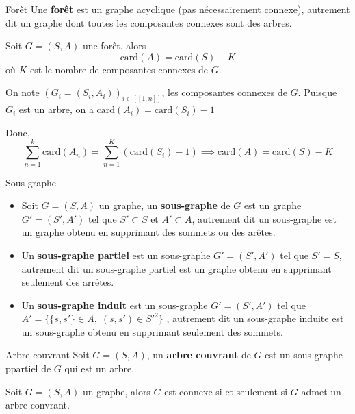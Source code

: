 \begin{Definition}[colbacktitle=red!75!black]{Forêt}{}
Une \textbf{forêt} est un graphe acyclique (pas nécessairement connexe), autrement dit un graphe dont toutes les composantes connexes sont des arbres.
\end{Definition}

\begin{Prop}{}{}
Soit $G = (S,A)$   une forêt, alors \[
\mathrm{card}(A) = \mathrm{card}  (S) - K
\]
où $K$   est le nombre de composantes connexes de $G$.
\end{Prop}

\begin{myproof}
  On note $\left( G_i = (S_i, A_i) \right) _{i \in [\![1,n]\!]}$, les composantes connexes de $G$. Puisque $G_i$ est un arbre, on a $\mathrm{card}(A_i) = \mathrm{card}(S_i) - 1$  

  Donc, \[
  \sum_{n=1}^{k} \mathrm{card} (A_n) = \sum_{n=1}^{K} (\mathrm{card} (S_i)-1) \implies \mathrm{card} (A) = \mathrm{card} (S) - K
  \]
\end{myproof}

\begin{Definition}[colbacktitle=red!75!black]{Sous-graphe}{}
  \begin{itemize}
    \item Soit $G=(S,A)$ un graphe, un \textbf{sous-graphe} de $G$ est un graphe $G'= (S', A')$ tel que $S' \subset S$ et $A' \subset A$, autrement dit un sous-graphe est un graphe obtenu en supprimant des sommets ou des arêtes. 
    \item Un \textbf{sous-graphe partiel} est un sous-graphe $G'=(S', A')$ tel que $S' =S$, autrement dit un sous-graphe partiel est un graphe obtenu en supprimant seulement des arrêtes.
    \item Un \textbf{sous-graphe induit} est un sous-graphe $G' = (S', A' )$   tel que $A' = \{\{s, s'\}\in A, \; (s, s') \in S'^{2}\}$ , autrement dit un sous-graphe induite est un sous-graphe obtenu en supprimant seulement des sommets.
  \end{itemize}

\end{Definition}

\begin{Definition}[colbacktitle=red!75!black]{Arbre couvrant}{}
Soit $G = (S,A)$, un \textbf{arbre couvrant} de $G$ est un sous-graphe ppartiel de $G$ qui est un arbre.
\end{Definition}

\begin{Prop}{}{}
Soit $G = (S,A)$ un graphe, alors $G$ est connexe si et seulement si $G$ admet un arbre convrant.
\end{Prop}

